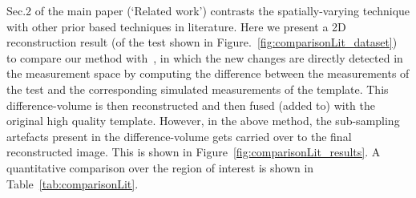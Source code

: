 \documentclass{article}
\begin{document}
Sec.2 of the main paper (`Related work') contrasts the spatially-varying technique  with other prior based techniques in literature. Here we present a 2D reconstruction  result (of the test shown in Figure.~\ref{fig:comparisonLit_dataset}) to compare our method with~\cite{Lee2012}, in which the new changes are directly detected in the measurement space by computing the difference between the measurements of the test and the corresponding simulated measurements of the template. This difference-volume is then reconstructed and then fused (added to) with the original high quality template. However, in the above method, the sub-sampling artefacts present in the difference-volume gets carried over to the final reconstructed image. This is shown in Figure~\ref{fig:comparisonLit_results}. A quantitative comparison over the region of interest is shown in Table~\ref{tab:comparisonLit}.
\end{document}
